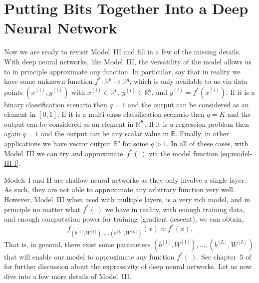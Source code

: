 \documentclass[12pt]{article}
\begin{document}
\section{Putting Bits Together Into a Deep Neural Network}
\label{sec:putting-bits-together}
Now we are ready to revisit Model~III and fill in a few of the missing details. With deep neural networks, like Model~III, the versatility of the model allows us to in principle approximate any function. In particular, say that in reality we have some unknown function $f^*: \mathbb{R}^p \longrightarrow {\mathbb R}^q$, which is only available to us via data points $(x^{(i)}, y^{(i)})$ with $x^{(i)} \in {\mathbb R}^p$, $y^{(i)} \in {\mathbb R}^q$,  and $y^{(i)} = f^*(x^{(i)})$. If it is a binary classification scenario then $q=1$ and the output can be considered as an element in $[0,1]$. If it is a multi-class classification scenario then $q=K$ and the output can be considered as an element in ${\mathbb R}^K$. If it is a regression problem then again $q=1$ and the output can be any scalar value in ${\mathbb R}$. Finally, in other applications we have vector output ${\mathbb R}^q$ for some $q>1$. In all of these cases, with Model~III we can try and approximate~$f^*(~)$  via the model function \eqref{eq:model-III-f}.

Models I and II are shallow neural networks as they only involve a single layer. As such, they are not able to approximate any arbitrary function very well. However, Model~III when used with multiple layers, is a very rich model, and in principle no matter what $f^*(~)$ we have in reality, with enough training data, and enough computation power for training (gradient descent), we can obtain,
%
\begin{equation}
\label{eq:mod3-approx}
f_{(b^{[1]}, W^{[1]}), \ldots, (b^{[L]}, W^{[L]})} (x) \approx f^*(x).
\end{equation}
%
That is, in general, there exist some parameters ${(b^{[1]}, W^{[1]}), \ldots, (b^{[L]}, W^{[L]})}$ that will enable our model to approximate any function $f^*(~)$. See chapter~5 of \cite{LiquetMokaNazarathy2024DeepLearning} for further discussion about the expressivity of deep neural networks. Let us now dive into a few more details of Model~III.
\end{document}
